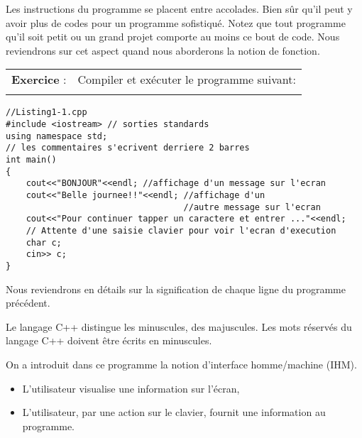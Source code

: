 \documentclass[a4paper, oneside,11pt]{book}
\begin{document}
Les instructions du programme se placent entre accolades. Bien s\^ur qu'il peut y avoir plus de codes pour un programme sofistiqu\'e. Notez que tout programme qu'il soit 
petit ou un  grand projet comporte au moins ce bout de code. Nous reviendrons sur cet aspect quand nous aborderons la notion de fonction.



 \begin{table}[hhhh]
 \begin{tabular}{ll}
 \textbf{Exercice} : &Compiler et ex\'ecuter le programme suivant:\\
 &\\
 \end{tabular}
 \end{table}


\begin{lstlisting}
//Listing1-1.cpp
#include <iostream> // sorties standards
using namespace std;
// les commentaires s'ecrivent derriere 2 barres
int main()
{
    cout<<"BONJOUR"<<endl; //affichage d'un message sur l'ecran
    cout<<"Belle journee!!"<<endl; //affichage d'un 
                                   //autre message sur l'ecran
    cout<<"Pour continuer tapper un caractere et entrer ..."<<endl;
    // Attente d'une saisie clavier pour voir l'ecran d'execution
    char c;
    cin>> c;
}
\end{lstlisting}
Nous reviendrons en d\'etails sur la signification de  chaque ligne du programme  pr\'ec\'edent. 

Le langage C++ distingue les minuscules, des majuscules. Les mots r\'eserv\'es du langage C++ doivent \^etre \'ecrits en minuscules.

On a introduit dans ce programme la notion d'interface homme/machine (IHM). 
\begin{itemize}
\item L'utilisateur visualise une information sur l'\'ecran,
\item  L'utilisateur, par une action sur le clavier, fournit une information au programme. 
\end{itemize}
\end{document}
